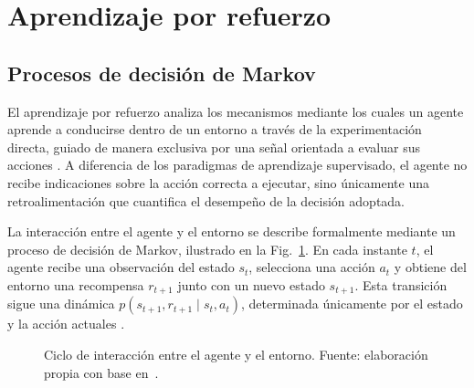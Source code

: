 \section{Aprendizaje por refuerzo}
\label{sec:rl}

\subsection{Procesos de decisión de Markov}

El aprendizaje por refuerzo analiza los mecanismos mediante los cuales un agente aprende a conducirse dentro de un entorno a través de la experimentación directa, guiado de manera exclusiva por una señal orientada a evaluar sus acciones \cite{sutton2018rl}.
A diferencia de los paradigmas de aprendizaje supervisado, el agente no recibe indicaciones sobre la acción correcta a ejecutar, sino únicamente una retroalimentación que cuantifica el desempeño de la decisión adoptada.

La interacción entre el agente y el entorno se describe formalmente mediante un proceso de decisión de Markov, ilustrado en la Fig.~\ref{fig:ciclo-rl}.
En cada instante $t$, el agente recibe una observación del estado $s_t$, selecciona una acción $a_t$ y obtiene del entorno una recompensa $r_{t+1}$ junto con un nuevo estado $s_{t+1}$.
Esta transición sigue una dinámica $p(s_{t+1}, r_{t+1} \mid s_t, a_t)$, determinada únicamente por el estado y la acción actuales \cite{sutton2018rl}.


\begin{figure}[H]
\centering
{}
\caption[Ciclo de interacción entre el agente y el entorno]{Ciclo de interacción entre el agente y el entorno. Fuente: elaboración propia con base en~\cite{sutton2018rl}.}
\label{fig:ciclo-rl}
\end{figure}

